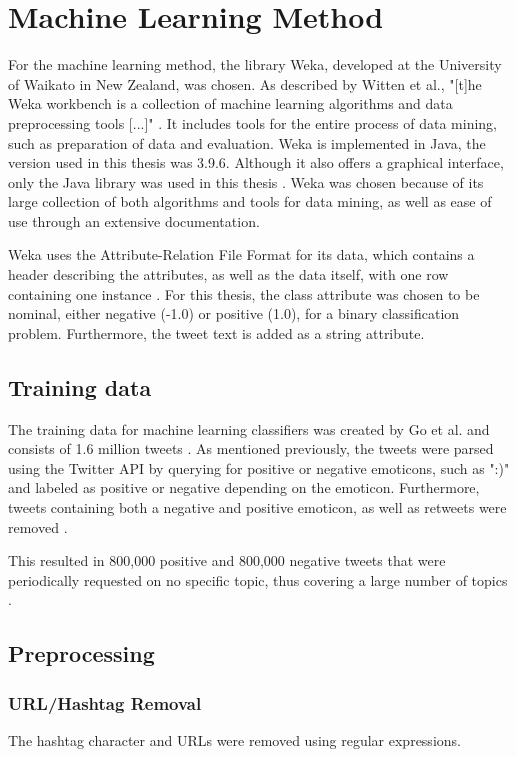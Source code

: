 \section{Machine Learning Method}

For the machine learning method, the library Weka, developed at the University of Waikato in New Zealand, was chosen. As described by Witten et al., "[t]he Weka workbench is a collection of machine learning algorithms and data preprocessing tools [...]" \cite[p.~7]{Weka}. It includes tools for the entire process of data mining, such as preparation of data and evaluation. Weka is implemented in Java, the version used in this thesis was 3.9.6. Although it also offers a graphical interface, only the Java library was used in this thesis \cite{Weka}. Weka was chosen because of its large collection of both algorithms and tools for data mining, as well as ease of use through an extensive documentation.

Weka uses the Attribute-Relation File Format for its data, which contains a header describing the attributes, as well as the data itself, with one row containing one instance \cite{Weka}. For this thesis, the class attribute was chosen to be nominal, either negative (-1.0) or positive (1.0), for a binary classification problem. Furthermore, the tweet text is added as a string attribute.

\subsection{Training data}
The training data for machine learning classifiers was created by Go et al. and consists of 1.6 million tweets \cite{GoBHaHua2009}. As mentioned previously, the tweets were parsed using the Twitter API by querying for positive or negative emoticons, such as ":)" and labeled as positive or negative depending on the emoticon. Furthermore, tweets containing both a negative and positive emoticon, as well as retweets were removed \cite{GoBHaHua2009}.

This resulted in 800,000 positive and 800,000 negative tweets that were periodically requested on no specific topic, thus covering a large number of topics \cite{GoBHaHua2009}.

\subsection{Preprocessing}

\subsubsection{URL/Hashtag Removal}
The hashtag character and URLs were removed using regular expressions.

